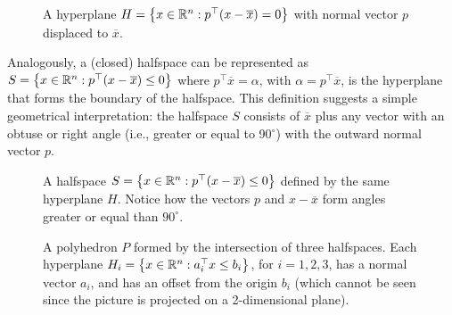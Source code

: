 	\begin{figure}[H]
		\caption{A hyperplane $H = \left\{ x \in \mathbb{R}^n: p^\top(x - \overline{x}) = 0 \right \}$ with normal vector $p$ displaced to $\overline{x}$.}
	\end{figure}
	
	Analogously, a (closed) halfspace can be represented as $S = \left\{ x \in \mathbb{R}^n : p^\top(x - \overline{x}) \le 0 \right \}$ where $p^\top \overline{x} = \alpha$, with $\alpha = p^\top \overline{x}$, is the hyperplane that forms the boundary of the halfspace. This definition suggests a simple geometrical interpretation: the halfspace $S$ consists of $\overline{x}$ plus any vector with an obtuse or right angle (i.e., greater or equal to 90$^\circ$) with the outward normal vector $p$.
 
 	\begin{figure}[H]
		\caption{A halfspace $S = \left\{ x \in \mathbb{R}^n : p^\top(x - \overline{x}) \le 0 \right \}$ defined by the same hyperplane $H$. Notice how the vectors $p$ and $x - \overline{x}$ form angles greater or equal than $90^\circ$.}
	\end{figure}
	
	\begin{figure}[H]
    \caption{A polyhedron $P$ formed by the intersection of three halfspaces. Each hyperplane $H_i = \left\{ x \in \mathbb{R}^n : a_i^\top x \leq b_i \right \}$, for $i = 1,2,3$, has a normal vector $a_i$, and has an offset from the origin $b_i$ (which cannot be seen since the picture is projected on a 2-dimensional plane).} \label{fig:polyhedral_set}
\end{figure}

